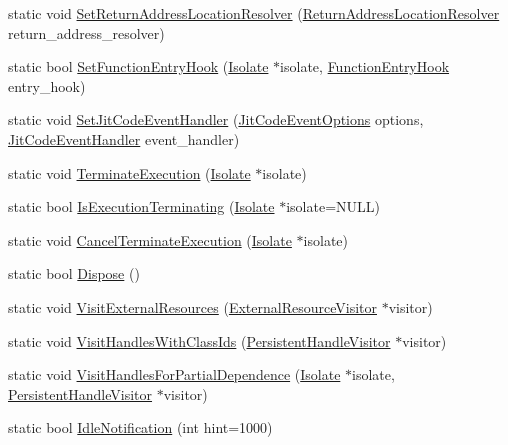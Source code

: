 \begin{DoxyCompactItemize}
\item 
static void \hyperlink{classv8_1_1V8_a7a9e8a96dcb3c3d306c0061b0a8e39c8}{Set\-Return\-Address\-Location\-Resolver} (\hyperlink{namespacev8_ada64a30dd6abd8c4cbf34503cb4d3a7a}{Return\-Address\-Location\-Resolver} return\-\_\-address\-\_\-resolver)
\item 
static bool \hyperlink{classv8_1_1V8_a156ba8ae8d0e4112725ad2dd410e280d}{Set\-Function\-Entry\-Hook} (\hyperlink{classv8_1_1Isolate}{Isolate} $\ast$isolate, \hyperlink{namespacev8_ad971c67718652f0d12cac5c0a0161e6c}{Function\-Entry\-Hook} entry\-\_\-hook)
\item 
static void \hyperlink{classv8_1_1V8_abf1b71bf2e3cb73fa44c6939bd70ab5e}{Set\-Jit\-Code\-Event\-Handler} (\hyperlink{namespacev8_a06f34fa4fa4cfc8518366808d1d461c1}{Jit\-Code\-Event\-Options} options, \hyperlink{namespacev8_a20e628e93f848c3350dcd4e49992bae6}{Jit\-Code\-Event\-Handler} event\-\_\-handler)
\item 
static void \hyperlink{classv8_1_1V8_a8ff3cfb774c8540cf7b2c3967d5755dd}{Terminate\-Execution} (\hyperlink{classv8_1_1Isolate}{Isolate} $\ast$isolate)
\item 
static bool \hyperlink{classv8_1_1V8_a8e0ad59109f022ecca7121e2ea990997}{Is\-Execution\-Terminating} (\hyperlink{classv8_1_1Isolate}{Isolate} $\ast$isolate=N\-U\-L\-L)
\item 
static void \hyperlink{classv8_1_1V8_ac2fb064870a2ca3bf6f7933c3dff6d85}{Cancel\-Terminate\-Execution} (\hyperlink{classv8_1_1Isolate}{Isolate} $\ast$isolate)
\item 
static bool \hyperlink{classv8_1_1V8_a566450d632c0a63770682b9da3cae08d}{Dispose} ()
\item 
static void \hyperlink{classv8_1_1V8_a1fd57739642c8304dc8a34dd283da840}{Visit\-External\-Resources} (\hyperlink{classv8_1_1ExternalResourceVisitor}{External\-Resource\-Visitor} $\ast$visitor)
\item 
static void \hyperlink{classv8_1_1V8_a5bf6f26e51cd3e9d71a662fe7efa5206}{Visit\-Handles\-With\-Class\-Ids} (\hyperlink{classv8_1_1PersistentHandleVisitor}{Persistent\-Handle\-Visitor} $\ast$visitor)
\item 
static void \hyperlink{classv8_1_1V8_ab2e242c45c73a0cee755e55acec71bd5}{Visit\-Handles\-For\-Partial\-Dependence} (\hyperlink{classv8_1_1Isolate}{Isolate} $\ast$isolate, \hyperlink{classv8_1_1PersistentHandleVisitor}{Persistent\-Handle\-Visitor} $\ast$visitor)
\item 
static bool \hyperlink{classv8_1_1V8_abcafb07ace99c980e42662299eb9eb1d}{Idle\-Notification} (int hint=1000)

\end{DoxyCompactItemize}
